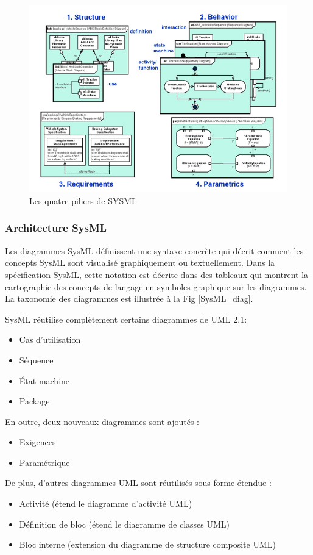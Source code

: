\documentclass[french]{spimufcphdthesis}
\begin{document}
\begin{figure}[H]
\begin{center}
\includegraphics[scale=0.75]{figures/4pillars.png}
\caption{Les quatre piliers de SYSML}
\label{4pilliars}
\end{center}
\end{figure}

\subsubsection{Architecture SysML}

 Les diagrammes SysML définissent une syntaxe concrète qui décrit comment les concepts SysML sont visualisé graphiquement ou textuellement. Dans la spécification SysML, cette notation est décrite dans des tableaux qui montrent la cartographie des concepts de langage en symboles graphique sur les diagrammes. La taxonomie des diagrammes est illustrée à la Fig \ref{SysML_diag}.

SysML réutilise complètement certains diagrammes de UML 2.1:
\begin{itemize}[label=\textbullet, font=\LARGE]
\item Cas d'utilisation
\item Séquence
\item État machine
\item Package
\end{itemize}
En outre, deux nouveaux diagrammes sont ajoutés :
\begin{itemize}[label=\textbullet, font=\LARGE]
\item Exigences
\item Paramétrique
\end{itemize}
De plus, d'autres diagrammes UML sont réutilisés sous forme étendue :
\begin{itemize}[label=\textbullet, font=\LARGE]
\item Activité (étend le diagramme d'activité UML)
\item Définition de bloc (étend le diagramme de classes UML)
\item Bloc interne (extension du diagramme de structure composite UML)
\end{itemize}
\end{document}
